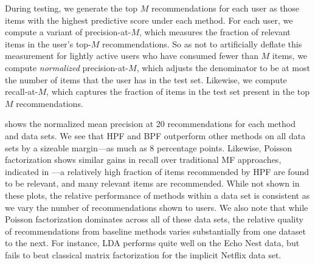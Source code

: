 During testing, we generate the top $M$ recommendations for each user
as those items with the highest predictive score under each
method. For each user, we compute a variant of precision-at-$M$, which
measures the fraction of relevant items in the user's top-$M$
recommendations. So as not to artificially deflate this measurement
for lightly active users who have consumed fewer than $M$ items, we
compute {\it normalized} precision-at-$M$, which adjusts the
denominator to be at most the number of items that the user has in the
test set. Likewise, we compute recall-at-$M$, which captures the
fraction of items in the test set present in the top $M$
recommendations.


 shows the normalized mean precision at 20
recommendations for each method and data sets. We see that HPF and BPF
outperform other methods on all data sets by a sizeable margin---as
much as 8 percentage points. Likewise, Poisson factorization shows
similar gains in recall over traditional MF approaches, indicated in
---a relatively high fraction of items recommended
by HPF are found to be relevant, and many relevant items are
recommended. While not shown in these plots, the relative performance
of methods within a data set is consistent as we vary the number of
recommendations shown to users. We also note that while Poisson
factorization dominates across all of these data sets, the relative
quality of recommendations from baseline methods varies substantially
from one dataset to the next. For instance, LDA performs quite well on
the Echo Nest data, but fails to beat classical matrix factorization
for the implicit Netflix data set.

